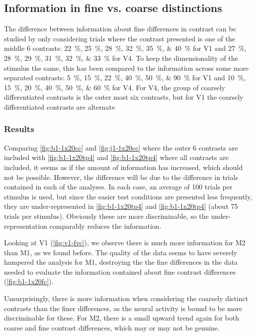 \subsection{Information in fine vs. coarse distinctions}

The difference between information about fine differences in contrast can be studied by only considering trials where the contrast presented is one of the middle 6 contrasts:
\SIlist{22;25;28;32;35;40}{\percent} for \ac{V1} and
\SIlist{27;28;29;31;32;33}{\percent} for \ac{V4}.
To keep the dimensionality of the stimulus the same, this has been compared to the information across some more separated contrasts:
\SIlist{5;15;22;40;50;90}{\percent} for \ac{V1} and
\SIlist{10;15;20;40;50;60}{\percent} for \ac{V4}.
For \ac{V4}, the group of coarsely differentiated contrasts is the outer most six contrasts, but for \ac{V1} the coarsely differentiated contrasts are alternate


\subsubsection{Results}

Comparing \autoref{fig:b1-1x20cc} and \autoref{fig:j1-1x20cc} where the outer 6 contrasts are included with \autoref{fig:b1-1x20tp4} and \autoref{fig:b1-1x20tp4} where all contrasts are included, it seems as if the amount of information has increased, which should not be possible.
However, the difference will be due to the difference in trials contained in each of the analyses.
In each case, an average of 100 trials per stimulus is used, but since the easier test conditions are presented less frequently, they are under-represented in \autoref{fig:b1-1x20tp4} and \autoref{fig:b1-1x20tp4} (about 75 trials per stimulus).
Obviously these are more discriminable, so the under-representation comparably reduces the information.

Looking at \ac{V1} (\autoref{fig:v1-fvc}), we observe there is much more information for \ac{M2} than \ac{M1}, as we found before.
The quality of the data seems to have severely hampered the analysis for \ac{M1}, destroying the the fine differences in the data needed to evaluate the information contained about fine contrast differences (\autoref{fig:b1-1x20fc}).

Unsurprisingly, there is more information when considering the coarsely distinct contrasts than the finer differences, as the neural activity is bound to be more discriminable for these.
For \ac{M2}, there is a small upward trend again for both coarse and fine contrast differences, which may or may not be genuine.

